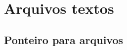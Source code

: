 \documentclass[handout]{beamer}
\begin{document}






\section{Arquivos textos}

\subsection{Ponteiro para arquivos}
\end{document}
